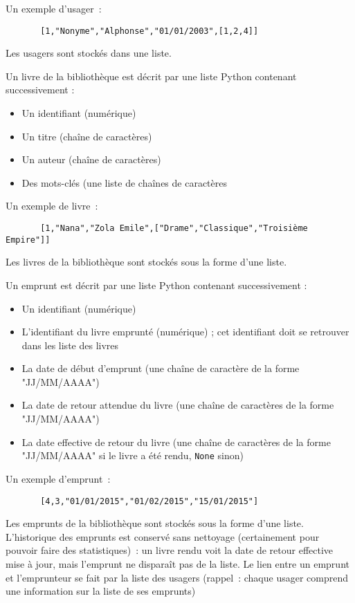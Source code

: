 \documentclass[10pt,a4paper,onecolumn]{article}
\begin{document}
Un exemple d'usager~:

\begin{verbatim}
       [1,"Nonyme","Alphonse","01/01/2003",[1,2,4]]
\end{verbatim}


Les usagers sont stockés dans une liste.

Un livre de la bibliothèque est décrit par une liste Python contenant successivement : 

\begin{itemize}
\item Un identifiant (numérique)
\item Un titre (chaîne de caractères)
\item Un auteur (chaîne de caractères)
\item Des mots-clés (une liste de chaînes de caractères
\end{itemize}

Un exemple de livre~:

\begin{verbatim}
       [1,"Nana","Zola Emile",["Drame","Classique","Troisième Empire"]]
\end{verbatim}

Les livres de la bibliothèque sont stockés sous la forme d'une liste.

Un emprunt est décrit par une liste Python contenant successivement :

\begin{itemize}
\item Un identifiant (numérique)
\item L'identifiant du livre emprunté (numérique) ; cet identifiant doit se retrouver dans les liste des livres
\item La date de début d'emprunt (une chaîne de caractère de la forme "JJ/MM/AAAA")
\item La date de retour attendue du livre (une chaîne de caractères de la forme "JJ/MM/AAAA")
\item La date effective de retour du livre (une chaîne de caractères de la forme "JJ/MM/AAAA" si le livre a été rendu, \texttt{None} sinon)
\end{itemize}

Un exemple d'emprunt~:

\begin{verbatim}
       [4,3,"01/01/2015","01/02/2015","15/01/2015"]
\end{verbatim}

Les emprunts de la bibliothèque sont stockés sous la forme d'une liste. L'historique des emprunts est conservé sans nettoyage (certainement pour pouvoir faire des statistiques)~: un livre rendu voit la date de retour effective mise à jour, mais l'emprunt ne disparaît pas de la liste. Le lien entre un emprunt et l'emprunteur se fait par la liste des usagers (rappel~: chaque usager comprend une information sur la liste de ses emprunts)
\end{document}
